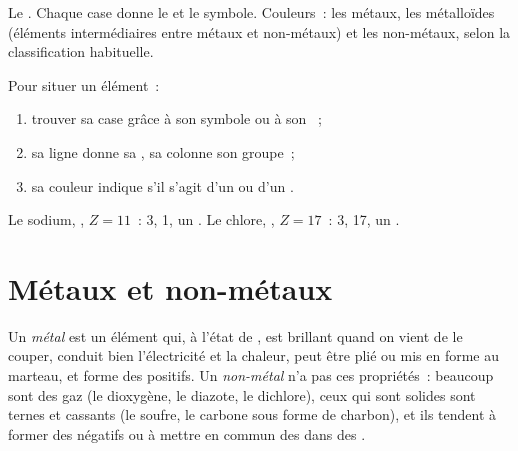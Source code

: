 \begin{omfigure}
\omperiodictable[colour=metals, legend=true, cell=0.86cm]

{\small Le . Chaque case donne le  et
le symbole. Couleurs~: les métaux, les métalloïdes (éléments
intermédiaires entre métaux et non-métaux) et les non-métaux, selon la
classification habituelle.}
\end{omfigure}

\begin{method}\label{met:g9:periodic-table-first-look:read}
Pour situer un élément~:
\begin{enumerate}
  \item trouver sa case grâce à son symbole ou à son ~;
  \item sa ligne donne sa , sa colonne son groupe~;
  \item sa couleur indique s'il s'agit d'un  ou d'un .
\end{enumerate}
Le sodium, , $Z = 11$~:  3,  1, un . Le chlore,
, $Z = 17$~:  3,  17, un .
\end{method}

\section{Métaux et non-métaux}

\begin{definition}\label{def:g9:periodic-table-first-look:metal}
Un \emph{métal} est un élément qui, à l'état de ,
est brillant quand on vient de le couper, conduit bien l'électricité et
la chaleur, peut être plié ou mis en forme au marteau, et forme des 
positifs. Un \emph{non-métal} n'a pas ces propriétés~:
beaucoup sont des gaz (le dioxygène, le diazote, le dichlore), ceux qui
sont solides sont ternes et cassants (le soufre, le carbone sous forme
de charbon), et ils tendent à former des  négatifs ou à mettre en
commun des  dans des .
\end{definition}

